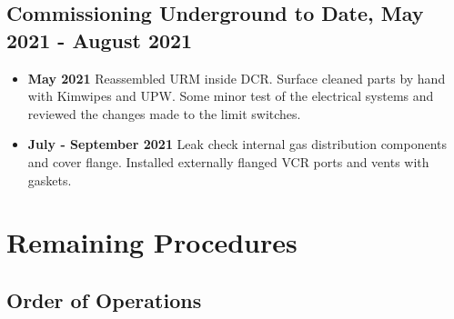 \documentclass[11pt]{article}
\begin{document}
\subsection{Commissioning Underground to Date, May 2021 - August 2021}
\begin{itemize}
\item {\bf May 2021} Reassembled URM inside DCR. Surface cleaned parts by hand with Kimwipes and UPW. Some minor test of the electrical systems and reviewed the changes made to the limit switches.
\item {\bf July - September 2021} Leak check internal gas distribution components and cover flange. Installed externally flanged VCR ports and vents with gaskets.
\end{itemize}

\section{Remaining Procedures}

\subsection{Order of Operations}
\end{document}
